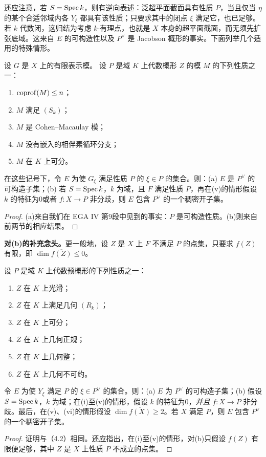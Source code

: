 还应注意，若 $S=\operatorname{Spec} k$，则有逆向表述：泛超平面截面具有性质 $P$，当且仅当 $\eta$ 的某个合适邻域内各 $Y_\xi$ 都具有该性质；只要求其中的闭点 $\xi$ 满足它，也已足够。若 $k$ 代数闭，这归结为考虑 $k$-有理点，也就是 $X$ 本身的超平面截面，而无须先扩张底域。这来自 $E$ 的可构造性以及 $P^\vee$ 是 Jacobson 概形的事实。下面列举几个适用的特殊情形。

设 $G$ 是 $X$ 上的有限表示模。
设 $P$ 是域 $K$ 上代数概形 $Z$ 的模 $M$ 的下列性质之一：
\begin{enumerate}[label=(\roman*)]
\item $\operatorname{coprof}(M)\leq n$；
\item $M$ 满足 $(S_k)$；
\item $M$ 是 Cohen--Macaulay 模；
\item $M$ 没有嵌入的相伴素循环分支；
\item $M$ 在 $K$ 上可分。
\end{enumerate}
在这些记号下，令 $E$ 为使 $G_\xi$ 满足性质 $P$ 的 $\xi\in P$ 的集合。则：(a) $E$ 是 $P^\vee$ 的可构造子集；(b) 若 $S=\operatorname{Spec} k$，$k$ 为域，且 $F$ 满足性质 $P$，再在(v)的情形假设 $k$ 的特征为0或者 $f:X\to P$ 非分歧，则 $E$ 包含 $P^\vee$ 的一个稠密开子集。
\begin{proof}
(a)来自我们在 EGA IV 第9段中见到的事实：$P$ 是可构造性质。(b)则来自前两节的相应结果。
\end{proof}
\noindent\textbf{对(b)的补充念头。}更一般地，设 $Z$ 是 $X$ 上 $F$ 不满足 $P$ 的点集，只要求 $f(Z)$ 有限，即 $\dim\overline{f(Z)}\leq0$。

设 $P$ 是域 $K$ 上代数预概形的下列性质之一：
\begin{enumerate}[label=(\roman*)]
\item $Z$ 在 $K$ 上光滑；
\item $Z$ 在 $K$ 上满足几何 $(R_k)$；
\item $Z$ 在 $K$ 上可分；
\item $Z$ 在 $K$ 上几何正规；
\item $Z$ 在 $K$ 上几何整；
\item $Z$ 在 $K$ 上几何不可约。
\end{enumerate}
令 $E$ 为使 $Y_\xi$ 满足 $P$ 的 $\xi\in P^\vee$ 的集合。则：(a) $E$ 为 $P^\vee$ 的可构造子集；(b) 假设 $S=\operatorname{Spec} k$，$k$ 为域；在(i)至(v)的情形，假设 $k$ 的特征为0，\emph{并且} $f:X\to P$ 非分歧。最后，在(v)、(vi)的情形假设 $\dim\overline{f(X)}\geq2$。若 $X$ 满足 $P$，则 $E$ 包含 $P^\vee$ 的一个稠密开子集。
\begin{proof}
证明与（4.2）相同。还应指出，在(i)至(v)的情形，对(b)只假设 $f(Z)$ 有限便足够，其中 $Z$ 是 $X$ 上性质 $P$ 不成立的点集。
\end{proof}

